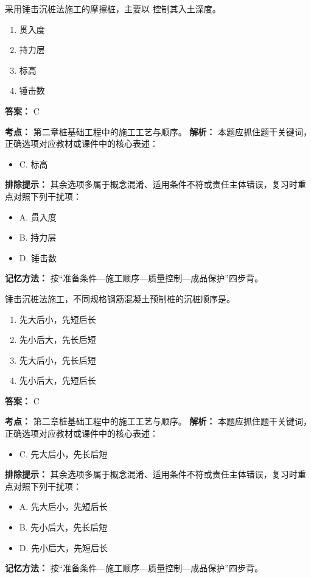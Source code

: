 \documentclass[UTF8,fontset=fandol,11pt]{ctexart}
\begin{document}
\begin{quizbox}[title={第 8 题}]
采用锤击沉桩法施工的摩擦桩，主要以 控制其入土深度。\\
\begin{enumerate}[label=\Alph*.]
\item 贯入度
\item 持力层
\item 标高
\item 锤击数
\end{enumerate}
\textbf{答案：} C
\vspace{0.25em}
\begin{answerbox}[title={考点解析}]
\textbf{考点：} 第二章桩基础工程中的施工工艺与顺序。
\textbf{解析：} 本题应抓住题干关键词，正确选项对应教材或课件中的核心表述：
\begin{itemize}
\item C. 标高
\end{itemize}
\textbf{排除提示：} 其余选项多属于概念混淆、适用条件不符或责任主体错误，复习时重点对照下列干扰项：
\begin{itemize}
\item A. 贯入度
\item B. 持力层
\item D. 锤击数
\end{itemize}
\textbf{记忆方法：} 按“准备条件—施工顺序—质量控制—成品保护”四步背。
\end{answerbox}
\end{quizbox}

\vspace{0.2em}

\begin{quizbox}[title={第 9 题}]
锤击沉桩法施工，不同规格钢筋混凝土预制桩的沉桩顺序是。\\
\begin{enumerate}[label=\Alph*.]
\item 先大后小，先短后长
\item 先小后大，先长后短
\item 先大后小，先长后短
\item 先小后大，先短后长
\end{enumerate}
\textbf{答案：} C
\vspace{0.25em}
\begin{answerbox}[title={考点解析}]
\textbf{考点：} 第二章桩基础工程中的施工工艺与顺序。
\textbf{解析：} 本题应抓住题干关键词，正确选项对应教材或课件中的核心表述：
\begin{itemize}
\item C. 先大后小，先长后短
\end{itemize}
\textbf{排除提示：} 其余选项多属于概念混淆、适用条件不符或责任主体错误，复习时重点对照下列干扰项：
\begin{itemize}
\item A. 先大后小，先短后长
\item B. 先小后大，先长后短
\item D. 先小后大，先短后长
\end{itemize}
\textbf{记忆方法：} 按“准备条件—施工顺序—质量控制—成品保护”四步背。
\end{answerbox}
\end{quizbox}
\end{document}
